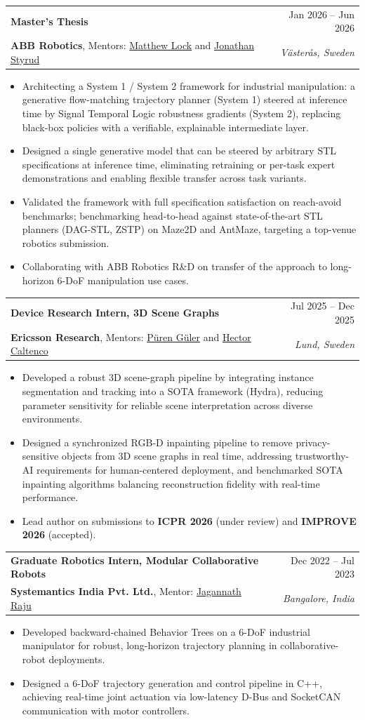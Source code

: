 \documentclass[letterpaper, 11pt]{article}
\makeatletter
\newcommand{\resumeItem}[1]{ \item\small{ {#1 \vspace{-2pt}} } }
\newcommand{\resumeSubheading}[4]{
\vspace{-1pt}
\item
\begin{tabular*}{1.0\textwidth}[t]{l@{\extracolsep{\fill}}r}
    \textbf{#1}       & {\small #2} \\
    {\small#3} & \textit{\small #4} \\
\end{tabular*}
\vspace{-10pt}
}
\newcommand{\resumeItemListStart}{\begin{itemize}[leftmargin=0.25in]}
\newcommand{\resumeItemListEnd}{\end{itemize}\vspace{-5pt}}
\makeatother
\begin{document}
    \resumeSubheading{Master's Thesis}{Jan 2026 -- Jun 2026}{\textbf{ABB Robotics}, Mentors: \href{https://www.linkedin.com/in/matthewwilliamlock/}{Matthew Lock} and \href{https://www.linkedin.com/in/jonathan-styrud-99385864/}{Jonathan Styrud}}{V\"aster\aa s, Sweden}
    \resumeItemListStart
        \resumeItem{Architecting a System 1 / System 2 framework for industrial manipulation: a generative flow-matching trajectory planner (System 1) steered at inference time by Signal Temporal Logic robustness gradients (System 2), replacing black-box policies with a verifiable, explainable intermediate layer.}
        \resumeItem{Designed a single generative model that can be steered by arbitrary STL specifications at inference time, eliminating retraining or per-task expert demonstrations and enabling flexible transfer across task variants.}
        \resumeItem{Validated the framework with full specification satisfaction on reach-avoid benchmarks; benchmarking head-to-head against state-of-the-art STL planners (DAG-STL, ZSTP) on Maze2D and AntMaze, targeting a top-venue robotics submission.}
        \resumeItem{Collaborating with ABB Robotics R\&D on transfer of the approach to long-horizon 6-DoF manipulation use cases.}
    \resumeItemListEnd

    \resumeSubheading{Device Research Intern, 3D Scene Graphs}{Jul 2025 -- Dec 2025}{\textbf{Ericsson Research}, Mentors: \href{https://se.linkedin.com/in/p\%C3\%BCren-g\%C3\%BCler-76457317}{P\"uren G\"uler} and \href{https://se.linkedin.com/in/hcaltenco}{Hector Caltenco}}{Lund, Sweden}
    \resumeItemListStart
        \resumeItem{Developed a robust 3D scene-graph pipeline by integrating instance segmentation and tracking into a SOTA framework (Hydra), reducing parameter sensitivity for reliable scene interpretation across diverse environments.}
        \resumeItem{Designed a synchronized RGB-D inpainting pipeline to remove privacy-sensitive objects from 3D scene graphs in real time, addressing trustworthy-AI requirements for human-centered deployment, and benchmarked SOTA inpainting algorithms balancing reconstruction fidelity with real-time performance.}
        \resumeItem{Lead author on submissions to \textbf{ICPR 2026} (under review) and \textbf{IMPROVE 2026} (accepted).}
    \resumeItemListEnd

    \resumeSubheading{Graduate Robotics Intern, Modular Collaborative Robots}{Dec 2022 -- Jul 2023}{\textbf{Systemantics India Pvt. Ltd.}, Mentor: \href{https://www.linkedin.com/in/jagannathraju/}{Jagannath Raju}}{Bangalore, India}
    \resumeItemListStart
        \resumeItem{Developed backward-chained Behavior Trees on a 6-DoF industrial manipulator for robust, long-horizon trajectory planning in collaborative-robot deployments.}
        \resumeItem{Designed a 6-DoF trajectory generation and control pipeline in C++, achieving real-time joint actuation via low-latency D-Bus and SocketCAN communication with motor controllers.}
    \resumeItemListEnd
\end{document}
